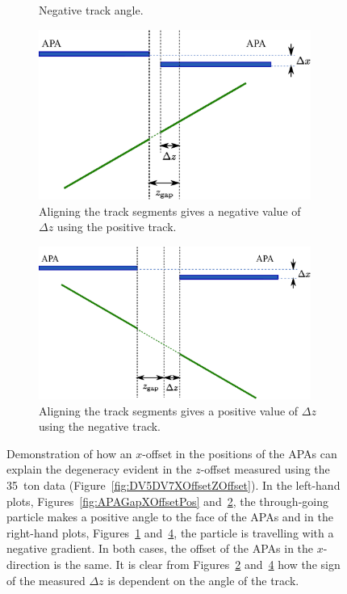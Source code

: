 \begin{figure}
\begin{subfigure}[t]{0.48\linewidth}
    \caption{Negative track angle.}
    \label{fig:APAGapXOffsetNeg}
  \end{subfigure}
  \vfill
  \begin{subfigure}[t]{0.48\linewidth}
    \centering
    \includegraphics[width=0.98\textwidth]{apa_gap_xoffset_pos_fix.eps}
    \caption{Aligning the track segments gives a negative value of $\Delta z$ using the positive track.}
    \label{fig:APAGapXOffsetPosFix}
  \end{subfigure}
  \hfill
  \begin{subfigure}[t]{0.48\linewidth}
    \centering
    \includegraphics[width=0.98\textwidth]{apa_gap_xoffset_neg_fix.eps}
    \caption{Aligning the track segments gives a positive value of $\Delta z$ using the negative track.}
    \label{fig:APAGapXOffsetNegFix}
  \end{subfigure}
  \caption[Demonstration of how an $x$-offset in the positions of the APAs can explain the degeneracy evident in the $z$-offset measured using the 35~ton data.]{Demonstration of how an $x$-offset in the positions of the APAs can explain the degeneracy evident in the $z$-offset measured using the 35~ton data (Figure~\ref{fig:DV5DV7XOffsetZOffset}).  In the left-hand plots, Figures~\ref{fig:APAGapXOffsetPos} and~\ref{fig:APAGapXOffsetPosFix}, the through-going particle makes a positive angle to the face of the APAs and in the right-hand plots, Figures~\ref{fig:APAGapXOffsetNeg} and~\ref{fig:APAGapXOffsetNegFix}, the particle is travelling with a negative gradient.  In both cases, the offset of the APAs in the $x$-direction is the same.  It is clear from Figures~\ref{fig:APAGapXOffsetPosFix} and~\ref{fig:APAGapXOffsetNegFix} how the sign of the measured $\Delta z$ is dependent on the angle of the track.}

\end{figure}
